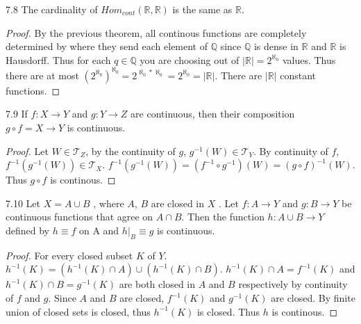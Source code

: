 \documentclass{article}
\newcommand*{\T}{\mathcal{T}}
\newcommand{\R}{\mathbb{R}}
\newcommand{\Q}{\mathbb{Q}}
\newcommand{\abs}[1]{\left\lvert #1\right\rvert}
\begin{document}
\begin{claim}{7.8}\label{Claim 7.8.}
    The cardinality of $Hom_{cont}(\R, \R)$ is the same as $\R$.    
\end{claim}
\begin{proof}
    By the previous theorem, all continous functions are completely determined by where they send each element of $\Q$ since $\Q$ is dense in $\R$ and $\R$ is Hausdorff. Thus for each $q \in \Q$ you are choosing out of $\abs{\R} = 2^{\aleph_0}$ values. Thus there are at most $(2^{\aleph_0})^{\aleph_0} = 2^{\aleph_0 * \aleph_0} = 2^{\aleph_0}= \abs{\R}$. There are $\abs{\R}$ constant functions.          
\end{proof}

\bigskip

\begin{claim}{7.9}\label{Claim 7.9.}
    If $f: X \to Y$ and $g: Y \to Z$  are continuous, then their composition $g \circ f = X \to Y$ is continuous.
\end{claim}
\begin{proof}
    Let $W \in \T_Z$, by the continuity of $g$, $g^{-1}(W) \in \T_Y$. By continuity of $f$, $f^{-1}(g^{-1}(W)) \in \T_X$. $f^{-1}(g^{-1}(W)) = (f^{-1} \circ g^{-1})(W) = (g \circ f)^{-1}(W)$. Thus $g \circ f$ is continous.         
\end{proof}

\bigskip

\begin{claim}{7.10}\label{Claim 7.10.}
    Let $X = A \cup B$ , where $A$, $B$ are closed in $X$ . Let $f: A \to Y$  and $g: B \to Y$ be continuous functions that agree on $A \cap B$. Then the function $h: A \cup B \to Y$ defined by $h \equiv f$ on A and $h|_{B} \equiv g$  is continuous.
\end{claim}
\begin{proof}
    For every closed subset $K$ of $Y$. $h^{-1}(K) = (h^{-1}(K) \cap A) \cup (h^{-1}(K) \cap B)$. $h^{-1}(K) \cap A = f^{-1}(K)$ and $h^{-1}(K) \cap B = g^{-1}(K)$ are both closed in $A$ and $B$ respectively by continuity of $f$ and $g$. Since $A$ and $B$ are closed, $f^{-1}(K)$ and $g^{-1}(K)$ are closed. By finite union of closed sets is closed, thus $h^{-1}(K)$ is closed. Thus $h$ is continous.                  
\end{proof}

\bigskip
\end{document}
